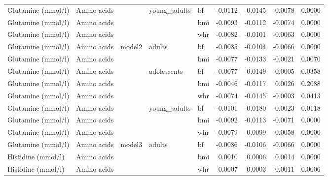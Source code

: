 \documentclass[11pt,twoside]{bristolthesis}
\begin{document}
\begin{longtable}[t]{lllllrrrr}
\cmidrule{1-2}
\cmidrule{5-9}\nopagebreak
Glutamine (mmol/l) & Amino acids &  & \multirow{-3}{*}{\raggedright\arraybackslash young\_adults} & bf & -0.0112 & -0.0145 & -0.0078 & 0.0000\\
\cmidrule{1-2}
\cmidrule{4-9}\nopagebreak
Glutamine (mmol/l) & Amino acids &  &  & bmi & -0.0093 & -0.0112 & -0.0074 & 0.0000\\
\cmidrule{1-2}
\cmidrule{5-9}\nopagebreak
Glutamine (mmol/l) & Amino acids &  &  & whr & -0.0082 & -0.0101 & -0.0063 & 0.0000\\
\cmidrule{1-2}
\cmidrule{5-9}\nopagebreak
Glutamine (mmol/l) & Amino acids & \multirow{-11}{*}{\raggedright\arraybackslash model2} & \multirow{-3}{*}{\raggedright\arraybackslash adults} & bf & -0.0085 & -0.0104 & -0.0066 & 0.0000\\
\cmidrule{1-9}\pagebreak[0]
Glutamine (mmol/l) & Amino acids &  &  & bmi & -0.0077 & -0.0133 & -0.0021 & 0.0070\\
\cmidrule{1-2}
\cmidrule{5-9}\nopagebreak
Glutamine (mmol/l) & Amino acids &  & \multirow{-2}{*}{\raggedright\arraybackslash adolescents} & bf & -0.0077 & -0.0149 & -0.0005 & 0.0358\\
\cmidrule{1-2}
\cmidrule{4-9}\nopagebreak
Glutamine (mmol/l) & Amino acids &  &  & bmi & -0.0046 & -0.0117 & 0.0026 & 0.2088\\
\cmidrule{1-2}
\cmidrule{5-9}\nopagebreak
Glutamine (mmol/l) & Amino acids &  &  & whr & -0.0074 & -0.0145 & -0.0003 & 0.0413\\
\cmidrule{1-2}
\cmidrule{5-9}\nopagebreak
Glutamine (mmol/l) & Amino acids &  & \multirow{-3}{*}{\raggedright\arraybackslash young\_adults} & bf & -0.0101 & -0.0180 & -0.0023 & 0.0118\\
\cmidrule{1-2}
\cmidrule{4-9}\nopagebreak
Glutamine (mmol/l) & Amino acids &  &  & bmi & -0.0092 & -0.0113 & -0.0071 & 0.0000\\
\cmidrule{1-2}
\cmidrule{5-9}\nopagebreak
Glutamine (mmol/l) & Amino acids &  &  & whr & -0.0079 & -0.0099 & -0.0058 & 0.0000\\
\cmidrule{1-2}
\cmidrule{5-9}\nopagebreak
Glutamine (mmol/l) & Amino acids & \multirow{-8}{*}{\raggedright\arraybackslash model3} & \multirow{-3}{*}{\raggedright\arraybackslash adults} & bf & -0.0086 & -0.0106 & -0.0066 & 0.0000\\
\cmidrule{1-9}\pagebreak[0]
Histidine (mmol/l) & Amino acids &  &  & bmi & 0.0010 & 0.0006 & 0.0014 & 0.0000\\
\cmidrule{1-2}
\cmidrule{5-9}\nopagebreak
Histidine (mmol/l) & Amino acids &  &  & whr & 0.0007 & 0.0003 & 0.0011 & 0.0006\\

\end{longtable}
\end{document}
